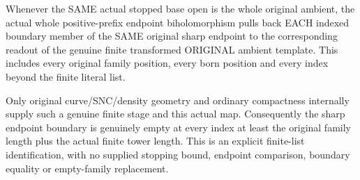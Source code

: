 \begin{theorem}
\label{hir:sharp-actual-curve-compact-finite-boundary-all-index-identity}
\leanok
Whenever the SAME actual stopped base open is the whole original ambient,
the actual whole positive-prefix endpoint biholomorphism pulls back EACH
indexed boundary member of the SAME original sharp endpoint to the
corresponding readout of the genuine finite transformed ORIGINAL ambient
template. This includes every original family position, every born
position and every index beyond the finite literal list.

Only original curve/SNC/density geometry and ordinary compactness
internally supply such a genuine finite stage and this actual map.
Consequently the sharp endpoint boundary is genuinely empty at every
index at least the original family length plus the actual finite tower
length. This is an explicit finite-list identification, with no supplied
stopping bound, endpoint comparison, boundary equality or empty-family
replacement.
\end{theorem}
